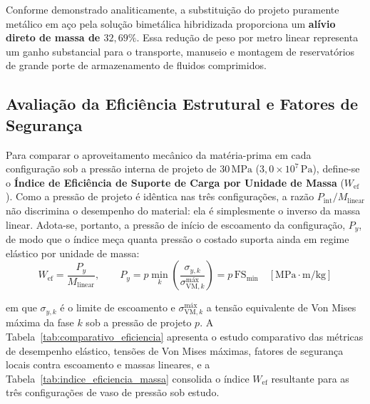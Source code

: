 Conforme demonstrado analiticamente, a substituição do projeto puramente metálico em aço pela solução bimetálica hibridizada proporciona um \textbf{alívio direto de massa de $32,69\%$}. Essa redução de peso por metro linear representa um ganho substancial para o transporte, manuseio e montagem de reservatórios de grande porte de armazenamento de fluidos comprimidos.

\subsection{Avaliação da Eficiência Estrutural e Fatores de Segurança}

Para comparar o aproveitamento mecânico da matéria-prima em cada configuração sob a pressão interna de projeto de $30 \, \text{MPa}$ ($3,0 \times 10^7 \, \text{Pa}$), define-se o \textbf{Índice de Eficiência de Suporte de Carga por Unidade de Massa} ($W_{\text{ef}}$). Como a pressão de projeto é idêntica nas três configurações, a razão $P_{\text{int}}/M_{\text{linear}}$ não discrimina o desempenho do material: ela é simplesmente o inverso da massa linear. Adota-se, portanto, a pressão de início de escoamento da configuração, $P_y$, de modo que o índice meça quanta pressão o costado suporta ainda em regime elástico por unidade de massa:
\begin{equation}
  W_{\text{ef}} = \frac{P_y}{M_{\text{linear}}}, \qquad
  P_y = p \min_{k} \left( \frac{\sigma_{y,k}}{\sigma_{\text{VM},k}^{\text{máx}}} \right) = p \, \text{FS}_{\min}
  \quad [\text{MPa} \cdot \text{m/kg}]
  \label{eq:indice_eficiencia_massa}
\end{equation}

em que $\sigma_{y,k}$ é o limite de escoamento e $\sigma_{\text{VM},k}^{\text{máx}}$ a tensão equivalente de Von Mises máxima da fase $k$ sob a pressão de projeto $p$. A Tabela~\ref{tab:comparativo_eficiencia} apresenta o estudo comparativo das métricas de desempenho elástico, tensões de Von Mises máximas, fatores de segurança locais contra escoamento e massas lineares, e a Tabela~\ref{tab:indice_eficiencia_massa} consolida o índice $W_{\text{ef}}$ resultante para as três configurações de vaso de pressão sob estudo.

